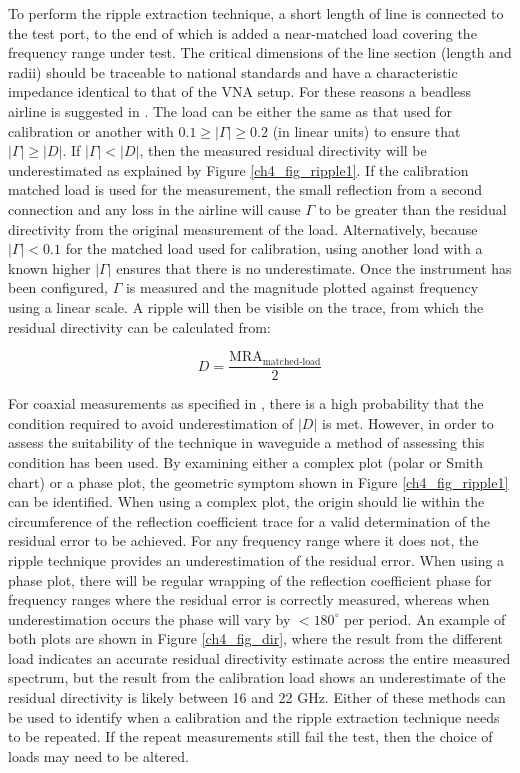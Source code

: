 \documentclass[../thesis/thesis.tex]{subfiles}
\begin{document}
To perform the ripple extraction technique, a short length of line is connected to the test port, to the end of which is added a near-matched load covering the frequency range under test. The critical dimensions of the line section (length and radii) should be traceable to national standards and have a characteristic impedance
identical to that of the VNA setup. For these reasons a beadless airline is suggested in \cite{EURAMET_2011}. The load can be either the same as that used for calibration or another with $0.1 \ge |\Gamma| \ge 0.2$ (in linear units) to ensure that $|\Gamma| \ge |D|$. If $|\Gamma| < |D|$, then the measured residual directivity will be underestimated as explained by Figure \ref{ch4_fig_ripple1}. If the calibration matched load is used for the measurement, the small reflection from a second connection and any loss in the airline will cause $\Gamma$ to be greater than the residual directivity from the original measurement of the load. Alternatively, because $|\Gamma| < 0.1$ for the matched load used for calibration, using another load with a known higher $|\Gamma|$ ensures that there is no underestimate. Once the instrument has been configured, $\Gamma$ is measured and the magnitude plotted against frequency using a linear scale. A ripple will then be visible on the trace, from which the residual directivity can be calculated from:

\begin{equation}
D = \frac{\textrm{MRA}_\textrm{matched-load}}{2}
\end{equation}

For coaxial measurements as specified in \cite{EURAMET_2011}, there is a high probability that the condition required to avoid underestimation of $|D|$ is met. However, in order to assess the suitability of the technique in waveguide a method of assessing this condition has been used. By examining either a complex plot (polar or Smith chart) or a phase plot, the geometric symptom shown in Figure \ref{ch4_fig_ripple1} can be identified. When using a complex plot, the origin should lie within the circumference of the reflection coefficient trace for a valid determination of the residual error to be achieved. For any frequency range where it does not, the ripple technique provides an underestimation of the residual error. When using a phase plot, there will be regular wrapping of the reflection coefficient phase for frequency ranges where the residual error is correctly measured, whereas when underestimation occurs the phase will vary by $<180^\circ$ per period. An example of both plots are shown in Figure \ref{ch4_fig_dir}, where the result from the different load indicates an accurate residual directivity estimate across the entire measured spectrum, but the result from the calibration load shows an underestimate of the residual directivity is likely between 16 and 22 GHz. Either of these methods can be used to identify when a calibration and the ripple extraction technique needs to be repeated. If the repeat measurements still fail the test, then the choice of loads may need to be altered. 
\end{document}
